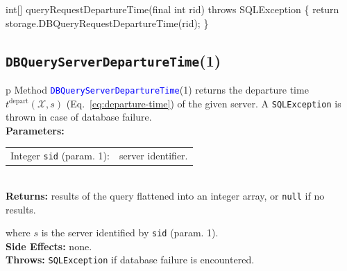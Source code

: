 \nwenddocs{}\endmoddef{}
int[] queryRequestDepartureTime(final int rid) throws SQLException \{
  return storage.DBQueryRequestDepartureTime(rid);
\}
\eatline
{}\nwendcode{}\nwdocspar
\subsection{{\tt{}\protect{}DBQueryServerDepartureTime}(1)}
\begin{tabular}{p{\textwidth}}
\toprule
{}
Method \textcolor{blue}{{\tt{}\protect{}DBQueryServerDepartureTime}}(1) returns the
departure time $t^\textrm{depart}(\mathcal{X},s)$
(Eq.~\ref{eq:departure-time}) of the given server.
A {\tt{}SQLException} is thrown in case of database failure.\\
\midrule
\textbf{Parameters:}\\
\begin{tabular}{lp{116mm}}
Integer {\tt{}sid} (param. 1):&server identifier.
\end{tabular}\\
\textbf{Returns:} results of the query flattened into an integer array,
or {\tt{}null} if no results.


where $s$ is the server identified by {\tt{}sid} (param. 1).\\
\textbf{Side Effects:} none.\\
\textbf{Throws:} {\tt{}SQLException} if database failure is encountered.\\
\bottomrule
\end{tabular}
